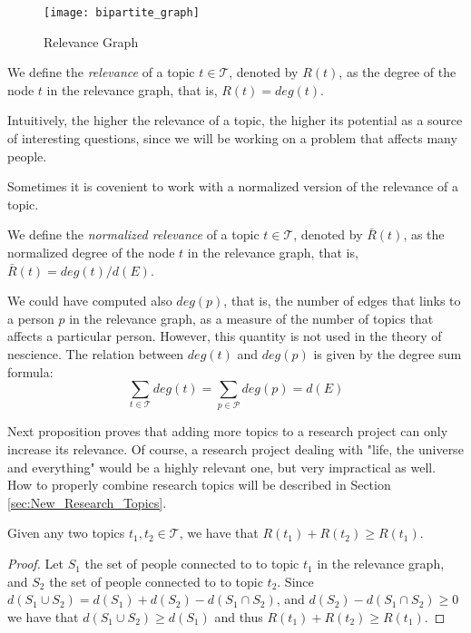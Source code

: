 \begin{figure}[h]
\centering\texttt{[image: bipartite\_graph]}
\caption{\label{fig:Relevance-Graph}Relevance Graph}
\end{figure}

\begin{definition}
\label{def:relevance}
We define the \emph{relevance} of a topic $t \in \mathcal{T}$, denoted by $R(t)$, as the degree of the node $t$ in the relevance graph, that is, $R(t) = deg(t)$.
\end{definition}

Intuitively, the higher the relevance of a topic, the higher its potential as a source of interesting questions, since we will be working on a problem that affects many people.

Sometimes it is covenient to work with a normalized version of the relevance of a topic.

\begin{definition}
\label{def:normalized_relevance}
We define the \emph{normalized relevance} of a topic $t \in \mathcal{T}$, denoted by $\bar{R}(t)$, as the normalized degree of the node $t$ in the relevance graph, that is, $\bar{R}(t) = deg(t) / d(E)$.
\end{definition}

We could have computed also $deg(p)$, that is, the number of edges that links to a person $p$ in the relevance graph, as a measure of the number of topics that affects a particular person. However, this quantity is not used in the theory of nescience. The relation between $deg(t)$ and $deg(p)$ is given by the degree sum formula:
\[
\sum_{t \in \mathcal{T}} deg(t) = \sum_{p \in \mathcal{P}} deg(p) = d(E)
\]

Next proposition proves that adding more topics to a research project can only increase its relevance. Of course, a research project dealing with "life, the universe and everything" would be a highly relevant one, but very impractical as well. How to properly combine research topics will be described in Section \ref{sec:New_Research_Topics}.

\begin{proposition}
\label{prop:nondecreasing_relevance}
Given any two topics $t_{1}, t_{2} \in \mathcal{T}$, we have that $R(t_{1}) + R(t_{2}) \geq R(t_{1})$.
\end{proposition}
\begin{proof}
Let $S_{1}$ the set of people connected to to topic $t_{1}$ in the relevance graph, and  $S_{2}$ the set of people connected to to topic $t_{2}$. Since $d \left( S_{1} \cup S_{2} \right) = d(S_{1}) + d(S_{2}) - d(S_{1} \cap S_{2})$, and $d(S_{2}) - d(S_{1} \cap S_{2}) \geq 0$ we have that $d \left( S_{1} \cup S_{2} \right) \geq d(S_{1})$ and thus $R(t_{1}) + R(t_{2}) \geq R(t_{1})$.
\end{proof}

